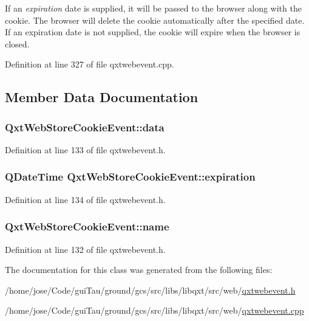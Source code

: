 If an {\itshape expiration} date is supplied, it will be passed to the browser along with the cookie. The browser will delete the cookie automatically after the specified date. If an expiration date is not supplied, the cookie will expire when the browser is closed. 

Definition at line 327 of file qxtwebevent.\-cpp.



\subsection{Member Data Documentation}
\hypertarget{class_qxt_web_store_cookie_event_ae0a064ada0cec351fa94632c6d0b8482}{
\subsubsection[{data}]{ Qxt\-Web\-Store\-Cookie\-Event\-::data}}\label{class_qxt_web_store_cookie_event_ae0a064ada0cec351fa94632c6d0b8482}


Definition at line 133 of file qxtwebevent.\-h.

\hypertarget{class_qxt_web_store_cookie_event_af6639c461349865d17bcb1329467fe85}{
\subsubsection[{expiration}]{\setlength{\rightskip}{0pt plus 5cm}Q\-Date\-Time Qxt\-Web\-Store\-Cookie\-Event\-::expiration}}\label{class_qxt_web_store_cookie_event_af6639c461349865d17bcb1329467fe85}


Definition at line 134 of file qxtwebevent.\-h.

\hypertarget{class_qxt_web_store_cookie_event_a7959bd008a7e8d50b7b44451ff7bc0c7}{
\subsubsection[{name}]{ Qxt\-Web\-Store\-Cookie\-Event\-::name}}\label{class_qxt_web_store_cookie_event_a7959bd008a7e8d50b7b44451ff7bc0c7}


Definition at line 132 of file qxtwebevent.\-h.



The documentation for this class was generated from the following files\-:\begin{DoxyCompactItemize}
\item 
/home/jose/\-Code/gui\-Tau/ground/gcs/src/libs/libqxt/src/web/\hyperlink{qxtwebevent_8h}{qxtwebevent.\-h}\item 
/home/jose/\-Code/gui\-Tau/ground/gcs/src/libs/libqxt/src/web/\hyperlink{qxtwebevent_8cpp}{qxtwebevent.\-cpp}\end{DoxyCompactItemize}
